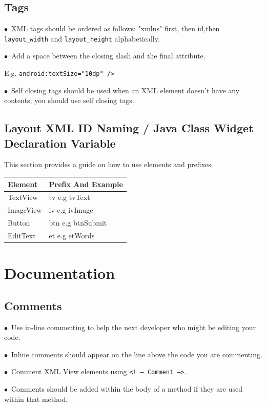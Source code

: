 \documentclass[english]{article}
\begin{document}
	\subsection{Tags}
$\bullet$\ XML tags should be ordered as follows: "xmlns" first, then id,then  \texttt{layout\_width} and  \texttt{layout\_height} alphabetically. \par
$\bullet$\ Add a space between the closing slash and the final attribute.\par E.g.  \texttt{android:textSize="10dp" /> }\par
$\bullet$\ Self closing tags should be used when an XML element doesn't have any contents, you should use self closing tags. \par

\subsection{Layout XML ID Naming / Java Class Widget Declaration Variable}
				
This section provides a guide on how to use elements and prefixes.
				\\
				\begin{tabular}{ |p{3cm}|p{9cm}|  }
				\hline
				\textbf{Element} & \textbf{Prefix And Example}  \\
				\hline
				TextView &	tv	e.g tvText\\
				\hline
				ImageView &	iv	e.g ivImage\\
				\hline
				Button &	btn	e.g btnSubmit\\
				\hline
				EditText &	et	e.g etWords \\
				\hline
				\end{tabular}

\section{Documentation}

\subsection{Comments}
$\bullet$\ Use in-line commenting to help the next developer who might be editing your code.\par
$\bullet$\ Inline comments should appear on the line above the code you are commenting.\par
$\bullet$\ Comment XML View elements using  \texttt{<! -- Comment -->}.\par
$\bullet$\ Comments should be added within the body of a method if they are used within that method.\par
\end{document}
